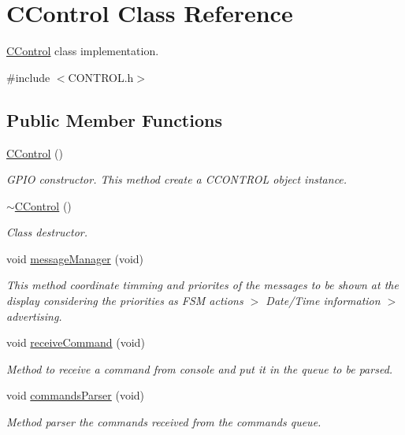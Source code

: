 \hypertarget{class_c_control}{}\section{C\+Control Class Reference}
\label{class_c_control}


\mbox{\hyperlink{class_c_control}{C\+Control}} class implementation.  




{\ttfamily \#include $<$C\+O\+N\+T\+R\+O\+L.\+h$>$}

\subsection*{Public Member Functions}
\begin{DoxyCompactItemize}
\item 
\mbox{\label{class_c_control_a6498500ff403327b5770a3acebed1d93}} 
\mbox{\hyperlink{class_c_control_a6498500ff403327b5770a3acebed1d93}{C\+Control}} ()
\begin{DoxyCompactList}\small\item\em G\+P\+IO constructor. This method create a C\+C\+O\+N\+T\+R\+OL object instance. \end{DoxyCompactList}\item 
\mbox{\label{class_c_control_ab2ae420ef75b010c0c9078e597781105}} 
\mbox{\hyperlink{class_c_control_ab2ae420ef75b010c0c9078e597781105}{$\sim$\+C\+Control}} ()
\begin{DoxyCompactList}\small\item\em Class destructor. \end{DoxyCompactList}\item 
void \mbox{\hyperlink{class_c_control_aa997117cf869f0e31dbb1f87f29ae8bf}{message\+Manager}} (void)
\begin{DoxyCompactList}\small\item\em This method coordinate timming and priorites of the messages to be shown at the display considering the priorities as F\+SM actions $>$ Date/\+Time information $>$ advertising. \end{DoxyCompactList}\item 
void \mbox{\hyperlink{class_c_control_ab698c7d1945864d1f5c35e091de1ab22}{receive\+Command}} (void)
\begin{DoxyCompactList}\small\item\em Method to receive a command from console and put it in the queue to be parsed. \end{DoxyCompactList}\item 
void \mbox{\hyperlink{class_c_control_a0ebf3ab01f3ea77f261b630ed2541f9d}{commands\+Parser}} (void)
\begin{DoxyCompactList}\small\item\em Method parser the commands received from the commands queue. \end{DoxyCompactList}\end{DoxyCompactItemize}


